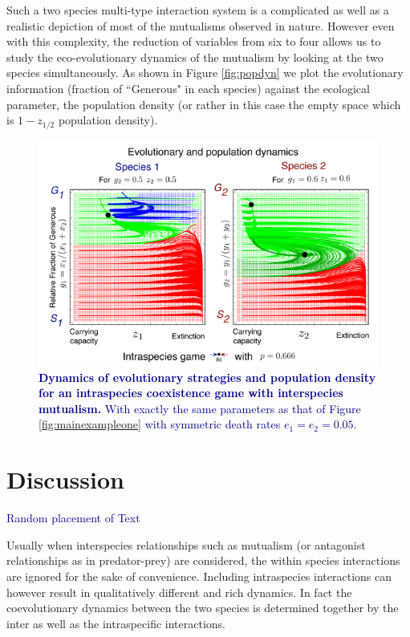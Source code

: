 \documentclass{pnastwo}
\newcommand{\cha}[1]{\textcolor{darkblue}{#1}}
\begin{document}
\begin{article}
Such a two species multi-type interaction system is a complicated as well as a realistic depiction of most of the mutualisms observed in nature.
However even with this complexity, the reduction of variables from six to four allows us to study the eco-evolutionary dynamics of the mutualism by looking at the two species simultaneously.
As shown in Figure \ref{fig:popdyn} we plot the evolutionary information (fraction of ``Generous" in each species) against the ecological parameter, the population density (or rather in this case the empty space which is $1-z_{1/2}$ population density).

\begin{figure}
\begin{center}
\includegraphics[width=1.6\columnwidth]{../Figures/mainexamplepopdyn2.pdf}
\caption{
\cha{\textbf{Dynamics of evolutionary strategies and population density for an intraspecies coexistence game with interspecies mutualism.}
With exactly the same parameters as that of Figure \ref{fig:mainexampleone} with  symmetric death rates $e_1 = e_2 = 0.05$.
}
}
\end{center}
\end{figure}




\section{Discussion}


\cha{Random placement of Text}

Usually when interspecies relationships such as mutualism (or antagonist relationships as in predator-prey) are considered, the within species interactions are ignored for the sake of convenience. Including intraspecies interactions can however result in qualitatively different and rich dynamics.
In fact the coevolutionary dynamics between the two species is determined together by the inter as well as the intraspecific interactions.


\end{article}
\end{document}
